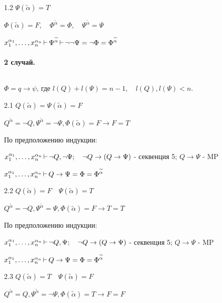 \begin{myproof}
\begin{myproof}
      1.2 $\Psi(\widetilde{\alpha}) = T$

      $\Phi(\widetilde{\alpha}) = F, \quad \Phi^{\widetilde{\alpha}} = \Phi, \quad
      \Psi^{\widetilde{\alpha}} = \Psi$ 
        
      $x_1^{\alpha_1},\ldots,x_{n}^{\alpha_n} \operatorname{\vdash} \Psi^{\widetilde{\alpha}} \operatorname{\vdash} \lnot\lnot\Psi =
      \lnot\Phi = \Phi^{\widetilde{\alpha}}$
        
      \paragraph*{2 случай.} ${}$ \newline
      
      $\Phi = q \to \psi$, где $l(Q) + l(\Psi) = n - 1, \quad l(Q), l(\Psi) < n$.

      \medskip

      2.1  $Q(\widetilde{\alpha}) = \Psi(\widetilde{\alpha}) = F$

      $Q^{\widetilde{\alpha}} = \lnot Q, \Psi^{\widetilde{\alpha}} = \lnot\Psi,
      \Phi(\widetilde{\alpha}) = F \to F = T$

      По предположению индукции:

      $x_1^{\alpha_1},\ldots,x_{n}^{\alpha_n} \operatorname{\vdash} \lnot Q, \lnot \Psi; \quad \lnot Q \to 
      (Q \to \Psi)$ - секвенция 5; $Q \to \Psi$ - MP

      $x_1^{\alpha_1},\ldots, x_{n}^{\alpha_n} \operatorname{\vdash} Q \to \Psi = \Phi = \Phi^{\widetilde{\alpha}}$

      \medskip

      2.2  $Q(\widetilde{\alpha}) = F \quad \Psi(\widetilde{\alpha}) = T$

      $Q^{\widetilde{\alpha}} = \lnot Q, \Psi^{\widetilde{\alpha}} = \Psi,
      \Phi(\widetilde{\alpha}) = F \to T = T$

      По предположению индукции:

      $x_1^{\alpha_1},\ldots,x_{n}^{\alpha_n} \operatorname{\vdash} \lnot Q, \Psi; \quad \lnot Q \to 
      (Q \to \Psi)$ - секвенция 5; $Q \to \Psi$ - MP

      $x_1^{\alpha_1},\ldots, x_{n}^{\alpha_n} \operatorname{\vdash} Q \to \Psi = \Phi = \Phi^{\widetilde{\alpha}}$

      \medskip

      2.3  $Q(\widetilde{\alpha}) = T \quad \Psi(\widetilde{\alpha}) = F$

      $Q^{\widetilde{\alpha}} = Q, \Psi^{\widetilde{\alpha}} = \lnot\Psi,
      \Phi(\widetilde{\alpha}) = T \to F = F$


\end{myproof}
\end{myproof}
